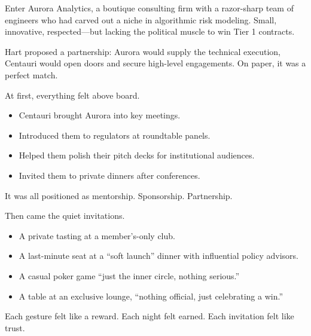 Enter Aurora Analytics, a boutique consulting firm with a razor-sharp team of engineers who had carved out a niche in algorithmic risk modeling. Small, innovative, respected—but lacking the political muscle to win Tier 1 contracts.

Hart proposed a partnership: Aurora would supply the technical execution, Centauri would open doors and secure high-level engagements. On paper, it was a perfect match.

At first, everything felt above board.

\begin{itemize}
  \item Centauri brought Aurora into key meetings.  
  \item Introduced them to regulators at roundtable panels.  
  \item Helped them polish their pitch decks for institutional audiences.  
  \item Invited them to private dinners after conferences.
\end{itemize}

It was all positioned as mentorship. Sponsorship. Partnership.

Then came the quiet invitations.

\begin{itemize}
  \item A private tasting at a member’s-only club.  
  \item A last-minute seat at a “soft launch” dinner with influential policy advisors.  
  \item A casual poker game “just the inner circle, nothing serious.”  
  \item A table at an exclusive lounge, “nothing official, just celebrating a win.”
\end{itemize}

Each gesture felt like a reward. Each night felt earned. Each invitation felt like trust.

  \medskip

